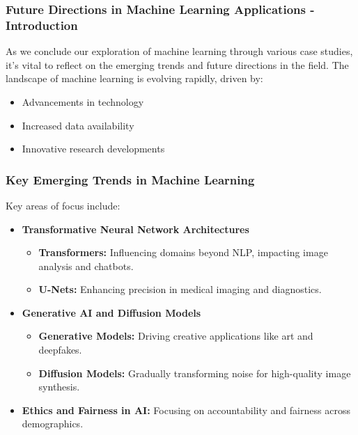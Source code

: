\documentclass[aspectratio=169]{beamer}
\begin{document}
\begin{frame}[fragile]
    \frametitle{Future Directions in Machine Learning Applications - Introduction}
    As we conclude our exploration of machine learning through various case studies, it's vital to reflect on the emerging trends and future directions in the field. The landscape of machine learning is evolving rapidly, driven by:
    \begin{itemize}
        \item Advancements in technology
        \item Increased data availability
        \item Innovative research developments
    \end{itemize}
\end{frame}

\begin{frame}[fragile]
    \frametitle{Key Emerging Trends in Machine Learning}
    Key areas of focus include:
    \begin{itemize}
        \item \textbf{Transformative Neural Network Architectures}
        \begin{itemize}
            \item \textbf{Transformers:} Influencing domains beyond NLP, impacting image analysis and chatbots.
            \item \textbf{U-Nets:} Enhancing precision in medical imaging and diagnostics.
        \end{itemize}
        \item \textbf{Generative AI and Diffusion Models}
        \begin{itemize}
            \item \textbf{Generative Models:} Driving creative applications like art and deepfakes.
            \item \textbf{Diffusion Models:} Gradually transforming noise for high-quality image synthesis.
        \end{itemize}
        \item \textbf{Ethics and Fairness in AI:} Focusing on accountability and fairness across demographics.
    \end{itemize}
\end{frame}
\end{document}
